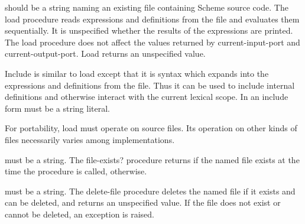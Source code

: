 \begin{entry}{%
}


 should be a string naming an existing file
containing Scheme source code.  The {\cf load} procedure reads
expressions and definitions from the file and evaluates them
sequentially.  It is unspecified whether the results of the expressions
are printed.  The {\cf load} procedure does not affect the values
returned by {\cf current-input-port} and {\cf current-output-port}.
{\cf Load} returns an unspecified value.

{\cf Include} is similar to {\cf load} except that it is syntax which
expands into the expressions and definitions from the file.  Thus it
can be used to include internal definitions and otherwise interact
with the current lexical scope.  In an {\cf include} form
 must be a string literal.

\begin{rationale}
For portability, {\cf load} must operate on source files.
Its operation on other kinds of files necessarily varies among
implementations.
\end{rationale}
\end{entry}

\begin{entry}{%
}

 must be a string. The {\cf file-exists?} procedure returns
\schtrue if the named file exists at the time the procedure is called,
\schfalse otherwise.

\end{entry}

\begin{entry}{%
}

 must be a string. The {\cf delete-file} procedure deletes the
named file if it exists and can be deleted, and returns an unspecified
value.  If the file does not exist or cannot be deleted, an exception
is raised.

\end{entry}


